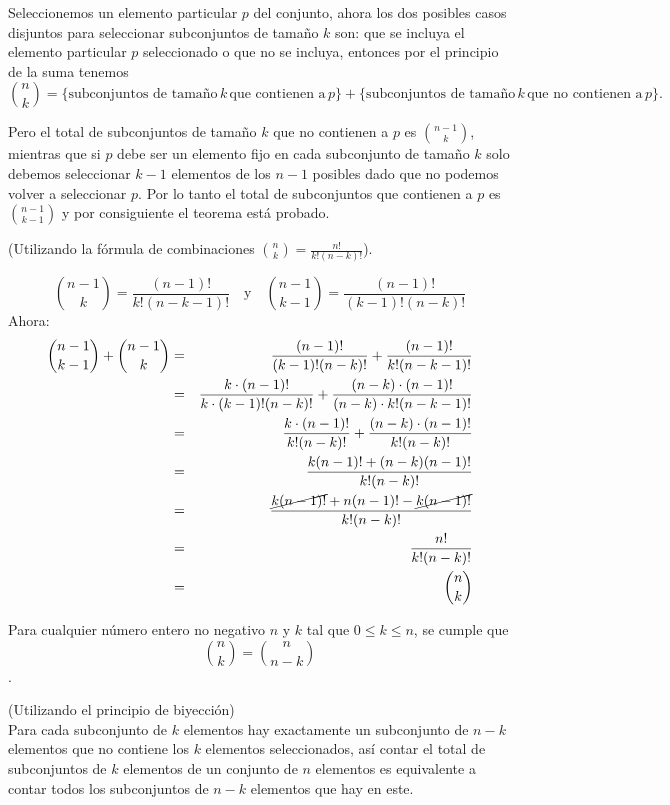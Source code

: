 \begin{demostracion}
Seleccionemos un elemento particular $p$ del conjunto, ahora los dos posibles casos disjuntos para seleccionar subconjuntos de tamaño $k$ son: que se incluya el elemento particular $p$ seleccionado o que no se incluya, entonces por el principio de la suma tenemos $$\binom{n}{k} = \{\text{subconjuntos de tamaño}\, k\, \text{que contienen a}\,p\}+\{\text{subconjuntos de tamaño}\, k\, \text{que no contienen a}\,p\}.$$

Pero el total de subconjuntos de tamaño $k$ que no contienen a $p$ es $\displaystyle\binom{n-1}{k}$, mientras que si $p$ debe ser un elemento fijo en cada subconjunto de tamaño $k$ solo debemos seleccionar $k-1$ elementos de los $n-1$ posibles dado que no podemos volver a seleccionar $p$. Por lo tanto el total de subconjuntos que contienen a $p$ es $\displaystyle\binom{n-1}{k-1}$ y por consiguiente el teorema está probado.
\end{demostracion}

\begin{demostracion}
(Utilizando la fórmula de combinaciones \(\displaystyle \binom{n}{k} = \frac{n!}{k!(n-k)!}\)).

\[\binom{n-1}{k} = \frac{(n-1)!}{k!(n-k-1)!} \quad \text{y} \quad \binom{n-1}{k-1} = \frac{(n-1)!}{(k-1)!(n-k)!}\]
Ahora:
\begin{eqnarray*}
    \binom{n-1}{k-1}+\binom{n-1}{k}&=&\frac{(n-1)!}{(k-1)!(n-k)!}+\frac{(n-1)!}{k!(n-k-1)!}\\
    &=&\frac{k\cdot (n-1)!}{k\cdot(k-1)!(n-k)!}+\frac{(n-k)\cdot(n-1)!}{(n-k)\cdot k!(n-k-1)!}\\
    &=& \frac{k\cdot (n-1)!}{k!(n-k)!}+\frac{(n-k)\cdot (n-1)!}{k!(n-k)!}\\
    &=&\frac{k(n-1)!+(n-k)(n-1)!}{k!(n-k)!}\\
    &=&\frac{\cancel{k(n-1)!}+n(n-1)!-\cancel{k(n-1)!}}{k!(n-k)!}\\
    &=&\frac{n!}{k!(n-k)!}\\
    &=&\binom{n}{k}
\end{eqnarray*}
\end{demostracion}

\begin{teorema}
Para cualquier número entero no negativo \( n \) y \( k \) tal que \( 0 \leq k \leq n \), se cumple que \[ \binom{n}{k} = \binom{n}{n-k} \].
\end{teorema}

\begin{demostracion}
(Utilizando el principio de biyección)\\
Para cada subconjunto de $k$ elementos hay exactamente un subconjunto de $n-k$ elementos que no contiene los $k$ elementos seleccionados, así contar el total de subconjuntos de $k$ elementos de un conjunto de $n$ elementos es equivalente a contar todos los subconjuntos de $n-k$ elementos que hay en este.
\end{demostracion}

